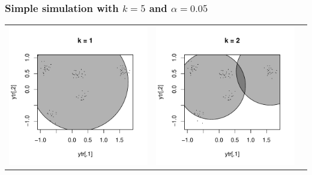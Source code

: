 \documentclass{beamer}
\begin{document}
\begin{frame}
\frametitle{Simple simulation with $k=5$ and $\alpha = 0.05$}
\newcommand{\scalesize}{0.3}
\begin{center}
\begin{tabular}{ccc}
\includegraphics[scale = \scalesize, clip = true, trim = 0.3in 0.4in 0.3in 0.2in]{../conformal_kmeans/k1.pdf} &
\includegraphics[scale = \scalesize, clip = true, trim = 0.3in 0.4in 0.3in 0.2in]{../conformal_kmeans/k2.pdf} &

\end{tabular}
\end{center}
\end{frame}
\end{document}
